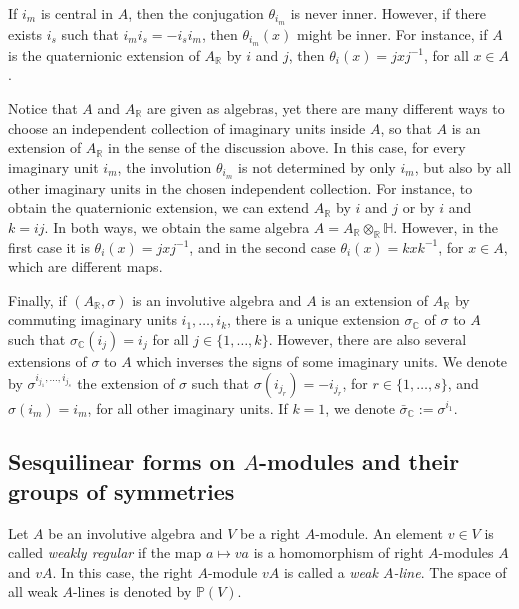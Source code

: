 \documentclass[oneside,11pt]{amsart}
\theoremstyle{definition}
\theoremstyle{remark}
\numberwithin{thm}{section}
\numberwithin{equation}{section}
\begin{document}
If $i_m$ is central in $A$, then the conjugation $\theta_{i_m}$ is never inner. However, if there exists $i_s$ such that $i_mi_s=-i_si_m$, then  $\theta_{i_m}(x)$ might be inner. For instance, if $A$ is the quaternionic extension of $A_\mathbb R$ by $i$ and $j$, then $\theta_i(x)=jxj^{-1}$, for all $x\in A$.

Notice that $A$ and $A_\mathbb R$ are given as algebras, yet there are many different ways to choose an independent collection of imaginary units inside $A$, so that $A$ is an extension of $A_\mathbb R$ in the sense of the discussion above. In this case, for every imaginary unit $i_m$, the involution $\theta_{i_m}$ is not determined by only $i_m$, but also by all other imaginary units in the chosen independent collection. For instance, to obtain the quaternionic extension, we can extend $A_\mathbb R$ by $i$ and $j$ or by $i$ and $k=ij$. In both ways, we obtain the same algebra $A=A_\mathbb R\otimes_{\mathbb R} \mathbb H$. However, in the first case it is $\theta_i(x)=jxj^{-1}$, and in the second case $\theta_i(x)=kxk^{-1}$, for $x\in A$, which are different maps. 

Finally, if $(A_\mathbb R,\sigma)$ is an involutive algebra and $A$ is an extension of $A_\mathbb R$ by commuting imaginary units $i_1,\dots,i_k$, there is a unique extension $\sigma_\mathbb C$ of $\sigma$ to $A$ such that $\sigma_\mathbb C(i_j)=i_j$ for all $j\in\{1,\dots, k\}$. However, there are also several extensions of $\sigma$ to $A$ which inverses the signs of some imaginary units. We denote by $\sigma^{i_{j_1},\dots, i_{j_s}}$ the extension of $\sigma$ such that $\sigma(i_{j_r})=-i_{j_r}$, for $r\in\{1,\dots, s\}$, and $\sigma(i_m)=i_m$, for all other imaginary units. If $k=1$, we denote $\bar\sigma_\mathbb C:=\sigma^{i_1}$.


\subsection{Sesquilinear forms on \texorpdfstring{$A$}{A}-modules and their groups of symmetries}\label{sec:sesq_forms}

Let $A$ be an involutive algebra and $V$ be a right $A$-module. An element $v\in V$ is called \emph{weakly regular} if the map $a\mapsto va$ is a homomorphism of right $A$-modules $A$ and $vA$. In this case, the right $A$-module $vA$ is called a \emph{weak $A$-line}. The space of all weak $A$-lines is denoted by $\mathbb P(V)$.
\end{document}
